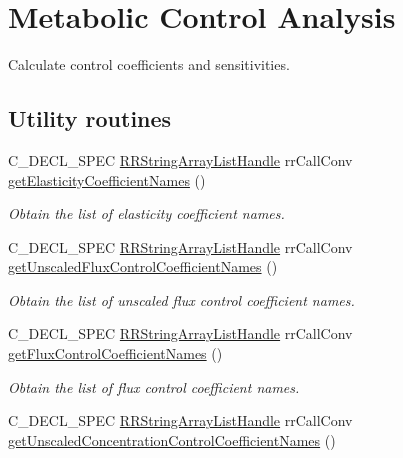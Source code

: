 \hypertarget{group__mca}{
\section{\-Metabolic \-Control \-Analysis}
\label{group__mca}
}


\-Calculate control coefficients and sensitivities.  


\subsection*{\-Utility routines}
\begin{DoxyCompactItemize}
\item 
\-C\-\_\-\-D\-E\-C\-L\-\_\-\-S\-P\-E\-C \*
\hyperlink{struct_r_r_string_array_list}{\-R\-R\-String\-Array\-List\-Handle} \*
rr\-Call\-Conv \hyperlink{group__utility_ga35b2d80dfae3ffba81a45a485e30b22e}{get\-Elasticity\-Coefficient\-Names} ()
\begin{DoxyCompactList}\small\item\em \-Obtain the list of elasticity coefficient names. \end{DoxyCompactList}\item 
\-C\-\_\-\-D\-E\-C\-L\-\_\-\-S\-P\-E\-C \*
\hyperlink{struct_r_r_string_array_list}{\-R\-R\-String\-Array\-List\-Handle} \*
rr\-Call\-Conv \hyperlink{group__utility_ga9451fdf700b80288c0d664193eef4421}{get\-Unscaled\-Flux\-Control\-Coefficient\-Names} ()
\begin{DoxyCompactList}\small\item\em \-Obtain the list of unscaled flux control coefficient names. \end{DoxyCompactList}\item 
\-C\-\_\-\-D\-E\-C\-L\-\_\-\-S\-P\-E\-C \*
\hyperlink{struct_r_r_string_array_list}{\-R\-R\-String\-Array\-List\-Handle} \*
rr\-Call\-Conv \hyperlink{group__utility_ga5d72e660bc33c6cbb93aadd603015563}{get\-Flux\-Control\-Coefficient\-Names} ()
\begin{DoxyCompactList}\small\item\em \-Obtain the list of flux control coefficient names. \end{DoxyCompactList}\item 
\-C\-\_\-\-D\-E\-C\-L\-\_\-\-S\-P\-E\-C \*
\hyperlink{struct_r_r_string_array_list}{\-R\-R\-String\-Array\-List\-Handle} \*
rr\-Call\-Conv \hyperlink{group__utility_ga4cd50e9e57140cb5fd69483bc6b0656e}{get\-Unscaled\-Concentration\-Control\-Coefficient\-Names} ()

\end{DoxyCompactItemize}
